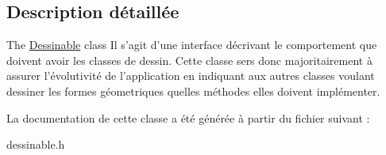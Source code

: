 \subsection{Description détaillée}
The \hyperlink{class_dessinable}{Dessinable} class Il s'agit d'une interface décrivant le comportement que doivent avoir les classes de dessin. Cette classe sers donc majoritairement à assurer l'évolutivité de l'application en indiquant aux autres classes voulant dessiner les formes géometriques quelles méthodes elles doivent implémenter. 

La documentation de cette classe a été générée à partir du fichier suivant \+:\begin{DoxyCompactItemize}
\item 
dessinable.\+h\end{DoxyCompactItemize}
